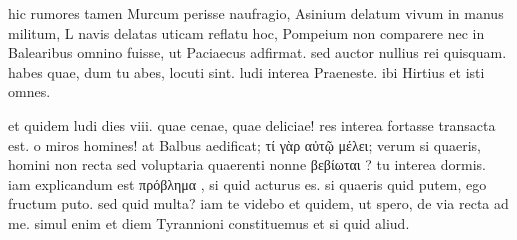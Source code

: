 


 hic rumores tamen Murcum perisse naufragio, Asinium delatum vivum in manus militum, L navis delatas uticam reflatu hoc, Pompeium non comparere nec in Balearibus omnino fuisse, ut Paciaecus adfirmat. sed auctor nullius rei quisquam. habes quae, dum tu abes, locuti sint. ludi interea Praeneste. ibi Hirtius et isti omnes.

 et quidem ludi dies viii. quae cenae, quae deliciae! res interea fortasse transacta est. o miros homines! at Balbus aedificat; τί γὰρ αὐτῷ μέλει; verum si quaeris, homini non recta sed voluptaria quaerenti nonne βεβίωται ? tu interea dormis. iam explicandum est πρόβλημα , si quid acturus es. si quaeris quid putem, ego fructum puto. sed quid multa? iam te videbo et quidem, ut spero, de via recta ad me. simul enim et diem Tyrannioni constituemus et si quid aliud.
